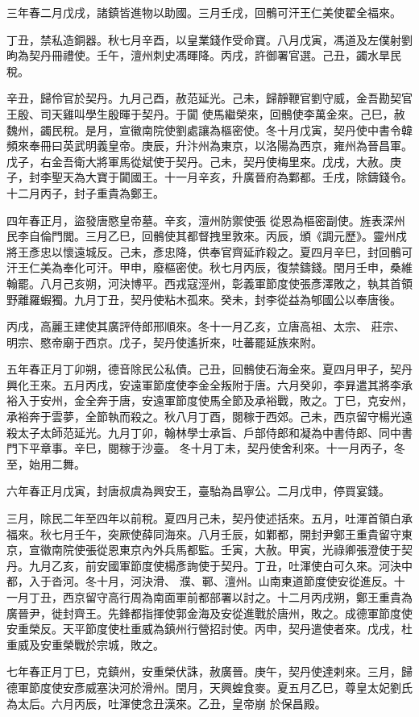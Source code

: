 \begin{pinyinscope}
 三年春二月戊戌，諸鎮皆進物以助國。三月壬戌，回鶻可汗王仁美使翟全福來。



 丁丑，禁私造銅器。秋七月辛酉，以皇業錢作受命寶。八月戊寅，馮道及左僕射劉昫為契丹冊禮使。壬午，澶州刺史馮暉降。丙戌，許御署官選。己丑，蠲水旱民稅。



 辛丑，歸伶官於契丹。九月己酉，赦范延光。己未，歸靜鞭官劉守威，金吾勘契官王殷、司天雞叫學生殷暉于契丹。于闐
 使馬繼榮來，回鶻使李萬金來。己巳，赦魏州，蠲民稅。是月，宣徽南院使劉處讓為樞密使。冬十月戊寅，契丹使中書令韓頻來奉冊曰英武明義皇帝。庚辰，升汴州為東京，以洛陽為西京，雍州為晉昌軍。戊子，右金吾衛大將軍馬從斌使于契丹。己未，契丹使梅里來。戊戌，大赦。庚子，封李聖天為大寶于闐國王。十一月辛亥，升廣晉府為鄴都。壬戌，除鑄錢令。十二月丙子，封子重貴為鄭王。



 四年春正月，盜發唐愍皇帝墓。辛亥，澶州防禦使張
 從恩為樞密副使。旌表深州民李自倫門閭。三月乙巳，回鶻使其都督拽里敦來。丙辰，頒《調元歷》。靈州戍將王彥忠以懷遠城反。己未，彥忠降，供奉官齊延祚殺之。夏四月辛巳，封回鶻可汗王仁美為奉化可汗。甲申，廢樞密使。秋七月丙辰，復禁鑄錢。閏月壬申，桑維翰罷。八月己亥朔，河決博平。西戎寇涇州，彰義軍節度使張彥澤敗之，執其首領野離羅蝦獨。九月丁丑，契丹使粘木孤來。癸未，封李從益為郇國公以奉唐後。



 丙戌，高麗王建使其廣評侍郎邢順來。冬十一月乙亥，立唐高祖、太宗、
 莊宗、明宗、愍帝廟于西京。戊子，契丹使遙折來，吐蕃罷延族來附。



 五年春正月丁卯朔，德音除民公私債。己丑，回鶻使石海金來。夏四月甲子，契丹興化王來。五月丙戌，安遠軍節度使李金全叛附于唐。六月癸卯，李昪遣其將李承裕入于安州，金全奔于唐，安遠軍節度使馬全節及承裕戰，敗之。丁巳，克安州，承裕奔于雲夢，全節執而殺之。秋八月丁酉，閱稼于西郊。己未，西京留守楊光遠殺太子太師范延光。九月丁卯，翰林學士承旨、戶部侍郎和凝為中書侍郎、同中書門下平章事。辛巳，閱稼于沙臺。
 冬十月丁未，契丹使舍利來。十一月丙子，冬至，始用二舞。



 六年春正月戊寅，封唐叔虞為興安王，臺駘為昌寧公。二月戊申，停買宴錢。



 三月，除民二年至四年以前稅。夏四月己未，契丹使述括來。五月，吐渾首領白承福來。秋七月壬午，突厥使薛同海來。八月壬辰，如鄴都，開封尹鄭王重貴留守東京，宣徽南院使張從恩東京內外兵馬都監。壬寅，大赦。甲寅，光祿卿張澄使于契丹。九月乙亥，前安國軍節度使楊彥詢使于契丹。丁丑，吐渾使白可久來。河決中都，入于沓河。冬十月，河決滑、
 濮、鄆、澶州。山南東道節度使安從進反。十一月丁丑，西京留守高行周為南面軍前都部署以討之。十二月丙戌朔，鄭王重貴為廣晉尹，徙封齊王。先鋒都指揮使郭金海及安從進戰於唐州，敗之。成德軍節度使安重榮反。天平節度使杜重威為鎮州行營招討使。丙申，契丹遣使者來。戊戌，杜重威及安重榮戰於宗城，敗之。



 七年春正月丁巳，克鎮州，安重榮伏誅，赦廣晉。庚午，契丹使達剌來。三月，歸德軍節度使安彥威塞決河於滑州。閏月，天興蝗食麥。夏五月乙巳，尊皇太妃劉氏為太后。六月丙辰，吐渾使念丑漢來。乙丑，皇帝崩
 於保昌殿。



\end{pinyinscope}